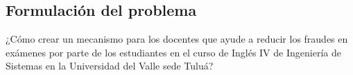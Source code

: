 \documentclass[../Main.tex]{subfiles}
\begin{document}
\subsection{Formulación del problema}
\begin{justify}
¿Cómo crear un mecanismo para los docentes que ayude a reducir los fraudes en exámenes por parte de los estudiantes en el curso de Inglés IV de Ingeniería de Sistemas en la Universidad del Valle sede Tuluá?
\end{justify}\par
\end{document}

